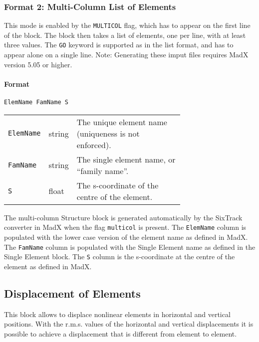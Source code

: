 \subsubsection{Format 2: Multi-Column List of Elements}\label{stru:multicol}

This mode is enabled by the \texttt{MULTICOL} flag, which has to appear on the first line of the block.
The block then takes a list of elements, one per line, with at least three values.
The \texttt{GO} keyword is supported as in the list format, and has to appear alone on a single line.
Note: Generating these imput files requires MadX version 5.05 or higher.

\paragraph{Format} \texttt{ElemName FamName S}

\bigskip
\begin{longtabu}{@{}llp{0.70\linewidth}}
    \texttt{ElemName} & string & The unique element name (uniqueness is not enforced). \\
    \texttt{FamName}  & string & The single element name, or ``family name''. \\
    \texttt{S}        & float  & The s-coordinate of the centre of the element.
\end{longtabu}

The multi-column Structure block is generated automatically by the SixTrack converter in MadX when the flag \texttt{multicol} is present.
The \texttt{ElemName} column is populated with the lower case version of the element name as defined in MadX.
The \texttt{FamName} column is populated with the Single Element name as defined in the Single Element block.
The \texttt{S} column is the s-coordinate at the centre of the element as defined in MadX.

\subsection{Displacement of Elements} \label{DisEle}

This block allows to displace nonlinear elements in horizontal and vertical positions.
With the r.m.s. values of the horizontal and vertical displacements it is possible to achieve a displacement that is different from element to element.

